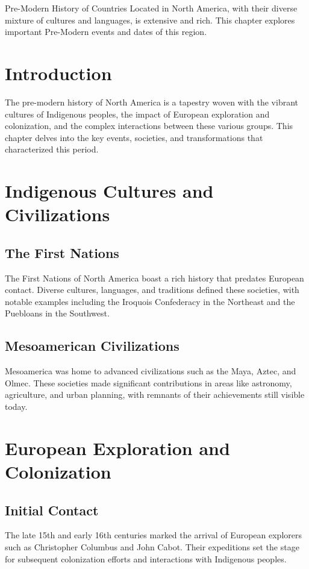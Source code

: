 \documentclass[a4paper,12pt]{book}
\begin{document}
Pre-Modern History of Countries Located in North America, with their diverse mixture of cultures and languages, is extensive and rich. This chapter explores important Pre-Modern events and dates of this region.

\section{Introduction}
\label{sec:introduction-north-america}
The pre-modern history of North America is a tapestry woven with the vibrant cultures of Indigenous peoples, the impact of European exploration and colonization, and the complex interactions between these various groups. This chapter delves into the key events, societies, and transformations that characterized this period.

\section{Indigenous Cultures and Civilizations}
\label{sec:indigenous-cultures}

\subsection{The First Nations}
The First Nations of North America boast a rich history that predates European contact. Diverse cultures, languages, and traditions defined these societies, with notable examples including the Iroquois Confederacy in the Northeast and the Puebloans in the Southwest.

\subsection{Mesoamerican Civilizations}
Mesoamerica was home to advanced civilizations such as the Maya, Aztec, and Olmec. These societies made significant contributions in areas like astronomy, agriculture, and urban planning, with remnants of their achievements still visible today.

\section{European Exploration and Colonization}
\label{sec:european-exploration-colonization}

\subsection{Initial Contact}
The late 15th and early 16th centuries marked the arrival of European explorers such as Christopher Columbus and John Cabot. Their expeditions set the stage for subsequent colonization efforts and interactions with Indigenous peoples.
\end{document}
